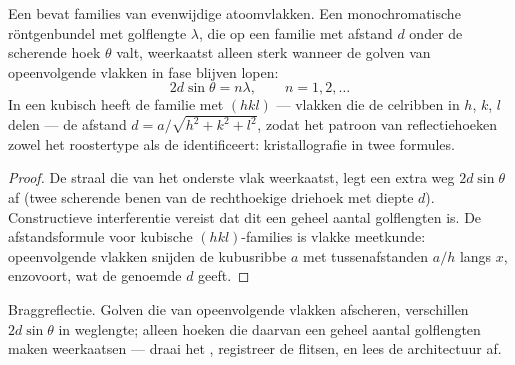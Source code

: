 \begin{proposition}\label{prop:b3:crystalline-solids:bragg}
Een  bevat families van evenwijdige atoomvlakken. Een
monochromatische röntgenbundel met golflengte $\lambda$, die op een familie
met afstand $d$ onder de scherende hoek $\theta$ valt, weerkaatst alleen sterk
wanneer de golven van opeenvolgende vlakken in fase blijven lopen:
\[
2d\sin\theta = n\lambda , \qquad n = 1, 2, \dots
\]
In een kubisch  heeft de familie met \emph{}
$(hkl)$ --- vlakken die de celribben in $h$, $k$, $l$ delen
--- de afstand $d = a/\sqrt{h^2 + k^2 + l^2}$, zodat het patroon van
reflectiehoeken zowel het roostertype als de 
identificeert: kristallografie in twee formules.
\end{proposition}

\begin{proof}
De straal die van het onderste vlak weerkaatst, legt een extra weg $2d
\sin\theta$ af (twee scherende benen van de rechthoekige driehoek met diepte $d$).
Constructieve interferentie vereist dat dit een geheel aantal
golflengten is. De afstandsformule voor kubische $(hkl)$-families is
vlakke meetkunde: opeenvolgende vlakken snijden de kubusribbe $a$ met
tussenafstanden $a/h$ langs $x$, enzovoort, wat de genoemde $d$ geeft.
\end{proof}

\begin{omfigure}

{\small Braggreflectie. Golven die van opeenvolgende vlakken afscheren,
verschillen $2d\sin\theta$ in weglengte; alleen hoeken die daarvan een geheel
aantal golflengten maken weerkaatsen --- draai het , registreer
de flitsen, en lees de architectuur af.}
\end{omfigure}


